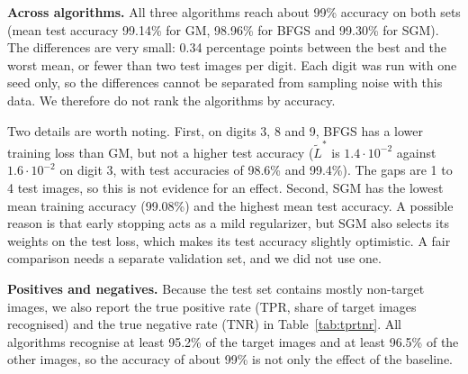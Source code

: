 \documentclass{article}
\begin{document}
\textbf{Across algorithms.} All three algorithms reach about 99\% accuracy on both sets (mean test accuracy 99.14\% for GM, 98.96\% for BFGS and 99.30\% for SGM). The differences are very small: 0.34 percentage points between the best and the worst mean, or fewer than two test images per digit. Each digit was run with one seed only, so the differences cannot be separated from sampling noise with this data. We therefore do not rank the algorithms by accuracy.

Two details are worth noting. First, on digits 3, 8 and 9, BFGS has a lower training loss than GM, but not a higher test accuracy ($\tilde L^*$ is $1.4\cdot10^{-2}$ against $1.6\cdot10^{-2}$ on digit 3, with test accuracies of 98.6\% and 99.4\%). The gaps are 1 to 4 test images, so this is not evidence for an effect. Second, SGM has the lowest mean training accuracy (99.08\%) and the highest mean test accuracy. A possible reason is that early stopping acts as a mild regularizer, but SGM also selects its weights on the test loss, which makes its test accuracy slightly optimistic. A fair comparison needs a separate validation set, and we did not use one.

\textbf{Positives and negatives.} Because the test set contains mostly non-target images, we also report the true positive rate (TPR, share of target images recognised) and the true negative rate (TNR) in Table~\ref{tab:tprtnr}. All algorithms recognise at least 95.2\% of the target images and at least 96.5\% of the other images, so the accuracy of about 99\% is not only the effect of the baseline.
\end{document}
